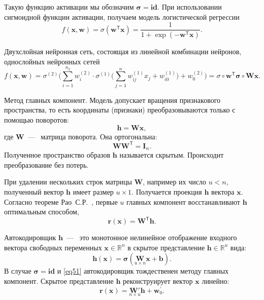 \documentclass[12pt, twoside]{article}
\newcommand{\xb}{{\mathbf{x}}}
\newcommand{\sigmab}{{\boldsymbol{\sigma}}}
\newcommand{\x}{{\mathbf{x}}}
\newcommand{\w}{{\mathbf{W}}}
\newcommand{\wm}{{\mathbf{w}}}
\begin{document}
Такую функцию активации мы обозначим $\sigmab = \textbf{id} $. При использовании сигмоидной функции активации,  получаем модель логистической регрессии \begin{equation}\label{eq49}
f(\xb,\wm)=\sigma(\wm^\mathsf{T}\xb)=\frac{1}{1+\exp(-\wm^\mathsf{T}\xb)} .
\end{equation}

Двухслойная нейронная сеть, состоящая из линейной комбинации нейронов, однослойных нейронных сетей
\begin{equation}\label{eq12}
f(\xb,\wm)=\sigma^{(2)}\bigg(\sum_{i=1}^{n_2}w_i^{(2)}\cdot\sigma^{(1)}\Bigg(\sum_{j=1}^{n}w_{ij}^{(1)}x_j+w_{i0}^{(1)}\Bigg)+w_0^{(2)}\bigg) = \sigma\circ \wm^{\mathsf{T}}\sigmab\circ \w\xb.
\end{equation}

Метод главных компонент. Модель допускает вращения признакового пространства, то есть координаты (признаки) преобразовываются только с помощью поворотов:
\begin{equation}
\mathbf{h} = \w\x,
\end{equation}
где $\w$~---~ матрица поворота. Она ортогональна: 
\begin{equation}\label{eq51}
\w\w^\mathsf{T} = \mathbf{I}_n.
\end{equation}
Полученное пространство образов $\mathbf{h}$ называется скрытым. Происходит преобразование без потерь.

При удалении нескольких строк матрицы $\w$, например их число $u < n$,  полученный вектор $\mathbf{h}$ имеет размер $u \times 1$. Получается проекция $\mathbf{h}$ вектора $\mathbf{x}$. Согласно теореме Рао~С.Р.~\cite{fourth}, первые $u$ главных компонент восстанавливают $\mathbf{h}$ оптимальным способом,
\begin{equation}\label{eq45}
\textbf{r}(\textbf{x}) = \w^{\mathsf{T}}\mathbf{h}.
\end{equation}

Автокодировщик $\mathbf{h}$~---~ это монотонное нелинейное отображение входного вектора свободных переменных $\textbf{x} \in \mathbb{R}^n$ в скрытое представление $\mathbf{h} \in \mathbb{R}^{u}$ вида:
\begin{equation}\label{eq52}
\mathbf{h}(\x) = \sigmab(\underset{u \times n}{\w}\x + \mathbf{b}) .
\end{equation}
В случае $\sigmab = \textbf{id}$ и \eqref{eq51} автокодировщик тождественен методу главных компонент. Скрытое представление $\textbf{h}$ реконструирует вектор $\textbf{x}$ линейно:
\begin{equation}\label{eq53}
\mathbf{r}(\x) = \underset{n \times u}{\w{'}}\mathbf{h} + \wm_{0}^{'} .
\end{equation}
\end{document}
